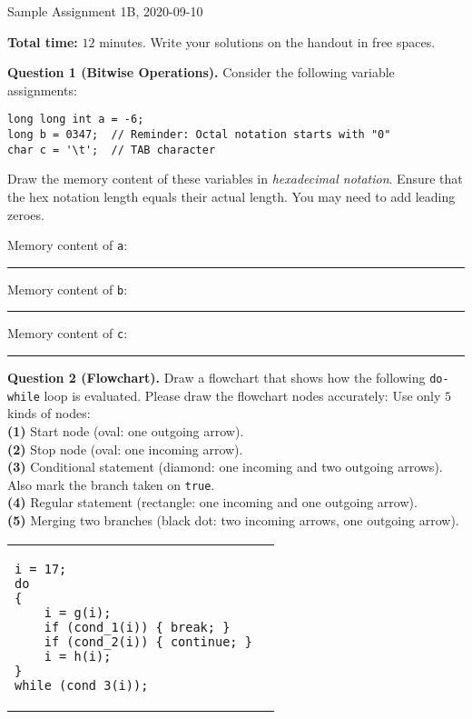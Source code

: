 \documentclass[11pt]{article}
\begin{document}
\thispagestyle{empty}



\begin{center}
{\Large Sample Assignment 1B, 2020-09-10}
\end{center}

{\bf Total time:} $12$ minutes.
Write your solutions on the handout in free spaces.

\vspace{10pt}
{\bf Question 1 (Bitwise Operations).} Consider the following variable assignments:
\begin{Verbatim}[frame=single]
long long int a = -6;  
long b = 0347;  // Reminder: Octal notation starts with "0"
char c = '\t';  // TAB character
\end{Verbatim}

Draw the memory content of these variables in {\em hexadecimal notation}. Ensure that the hex notation
length equals their actual length. You may need to add leading zeroes.

\vspace{10pt}
Memory content of {\tt a}: \rule{4cm}{0.4pt} 

\vspace{10pt}
Memory content of {\tt b}: \rule{4cm}{0.4pt} 

\vspace{10pt}
Memory content of {\tt c}: \rule{4cm}{0.4pt} 




\vspace{20pt}
{\bf Question 2 (Flowchart).} 
Draw a flowchart that shows how the following {\tt do-while} loop is evaluated. 
Please draw the flowchart nodes accurately: Use only $5$ kinds of nodes:\\
{\bf (1)} Start node (oval: one outgoing arrow).\\
{\bf (2)} Stop node (oval: one incoming arrow).\\
{\bf (3)} Conditional statement (diamond: one incoming and two outgoing arrows). Also mark the branch taken on {\tt true}. \\
{\bf (4)} Regular statement (rectangle: one incoming and one outgoing arrow).\\
{\bf (5)} Merging two branches (black dot: two incoming arrows, one outgoing arrow).


\vspace{5mm}
\begin{tabular}{@{}ll@{}} 
\begin{minipage}{0.48\columnwidth}
\begin{Verbatim}[frame=single]
i = 17;
do 
{
    i = g(i);
    if (cond_1(i)) { break; }
    if (cond_2(i)) { continue; }
    i = h(i);
}
while (cond_3(i));
\end{Verbatim}
\end{minipage} &
\begin{minipage}{0.5\columnwidth}
\mbox{}
\end{minipage}
\end{tabular}
\end{document}
